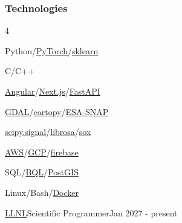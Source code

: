 \documentclass{article}
\newenvironment{mylist}[2]{
  \subsubsection*{#1}
  \begin{multicols}{#2}
  \small
  \begin{list}{}{}
   \setlength{\topsep}{0pt}
   \setlength{\itemsep}{1pt}
   \setlength{\parskip}{0pt}
   \setlength{\parsep}{0pt}}{\end{list}\end{multicols}\normalsize}
\def\bsp{-.1in}
\begin{document}
\begin{mylist}{Technologies}{4}
\item Python/\href{https://pytorch.org/}{PyTorch}/\href{https://scikit-learn.org/stable/}{sklearn}
\item C/C++
\item \href{https://angular.io/}{Angular}/\href{https://nextjs.org/}{Next.js}/\href{https://fastapi.tiangolo.com/}{FastAPI}%
\item \href{https://gdal.org/en/stable/}{GDAL}/\href{https://scitools.org.uk/cartopy/docs/latest/}{cartopy}/\href{https://step.esa.int/main/download/snap-download/}{ESA-SNAP}%
\item
\href{https://scipy.github.io/devdocs/reference/signal.html#module-scipy.signal}{scipy.signal}/\href{https://librosa.org}{librosa}/\href{https://github.com/chirlu/sox}{sox}%
\item \href{https://aws.amazon.com/}{AWS}/\href{https://cloud.google.com/}{GCP}/\href{https://firebase.google.com/}{firebase}
\item SQL/\href{https://docs.cloud.google.com/bigquery/docs}{BQL}/\href{https://postgis.net/}{PostGIS}
\item Linux/Bash/\href{https://www.docker.com/}{Docker}
\end{mylist}

\newcommand{\BSec}[1]{
\noindent{\hspace{\bsp} \LARGE{\bf #1}{ }\hrulefill}}

\TabPositions{2.3in} %
\def\tabb{\tab}  %

\BSec{}%
\begin{**mylist}[Nuclear]{\href{https://www.llnl.gov/}{LLNL}}{Scientific Programmer}{Jan 2027 - present}
\item
\end{**mylist}
\end{document}
